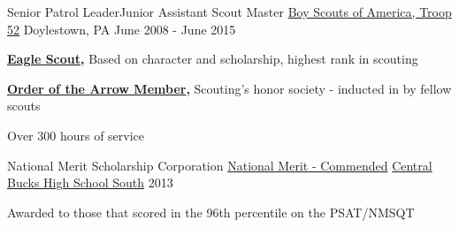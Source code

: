 \begin{cventries}
  \cventry
    {Senior Patrol Leader{\enskip\cdotp\enskip}Junior Assistant Scout Master} %
    {\href{https://www.troop52campers.org/}{Boy Scouts of America, Troop 52}} %
    {Doylestown, PA} %
    {June 2008 - June 2015} %
    {
      \begin{cvitems} %
        \item {\textbf{\href{https://www.troop52campers.org/content/troop-52-eagle-scout-honor-roll}{Eagle Scout},} Based on character and scholarship, highest rank in scouting}
        \item {\textbf{\href{https://oa-bsa.org/}{Order of the Arrow Member},} Scouting’s honor society - inducted in by fellow scouts}
        \item {Over 300 hours of service}
      \end{cvitems}
    }

  \cventry
    {National Merit Scholarship Corporation} %
    {\href{https://www.nationalmerit.org/nmsp}{National Merit - Commended}} %
    {\href{https://www.cbsd.org/cbsouth}{Central Bucks High School South}} %
    {2013} %
    {
      \begin{cvitems} %
        \item {Awarded to those that scored in the 96th percentile on the PSAT/NMSQT}
      \end{cvitems}
    }

  \vspace{-6mm}

\end{cventries}